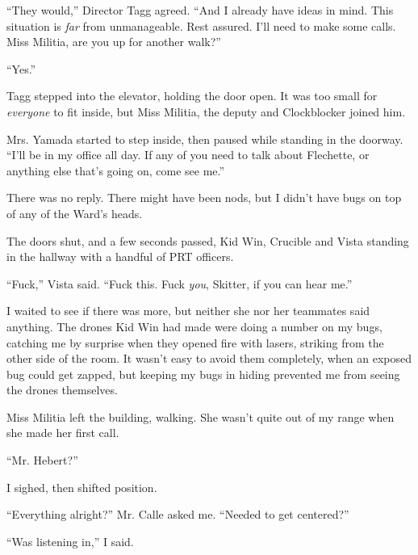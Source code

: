 ``They would,'' Director Tagg agreed.  ``And I already have ideas in mind.  This situation is \emph{far} from unmanageable.  Rest assured.  I'll need to make some calls.  Miss Militia, are you up for another walk?''



``Yes.''



Tagg stepped into the elevator, holding the door open.  It was too small for \emph{everyone} to fit inside, but Miss Militia, the deputy and Clockblocker joined him.



Mrs. Yamada started to step inside, then paused while standing in the doorway.  ``I'll be in my office all day.  If any of you need to talk about Flechette, or anything else that's going on, come see me.''



There was no reply.  There might have been nods, but I didn't have bugs on top of any of the Ward's heads.



The doors shut, and a few seconds passed, Kid Win, Crucible and Vista standing in the hallway with a handful of PRT officers.



``Fuck,'' Vista said.  ``Fuck this.  Fuck \emph{you}, Skitter, if you can hear me.''



I waited to see if there was more, but neither she nor her teammates said anything.  The drones Kid Win had made were doing a number on my bugs, catching me by surprise when they opened fire with lasers, striking from the other side of the room.  It wasn't easy to avoid them completely, when an exposed bug could get zapped, but keeping my bugs in hiding prevented me from seeing the drones themselves.



Miss Militia left the building, walking.  She wasn't quite out of my range when she made her first call.



``Mr. Hebert?''



I sighed, then shifted position.



``Everything alright?'' Mr. Calle asked me.  ``Needed to get centered?''



``Was listening in,'' I said.



